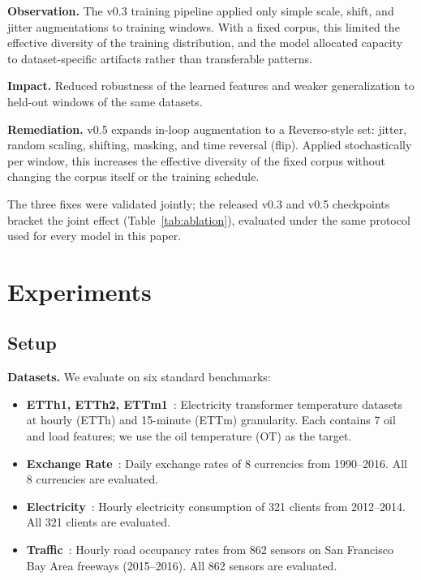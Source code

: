 \documentclass[11pt]{article}
\begin{document}
\textbf{Observation.} The v0.3 training pipeline applied only simple scale, shift, and jitter augmentations to training windows. With a fixed corpus, this limited the effective diversity of the training distribution, and the model allocated capacity to dataset-specific artifacts rather than transferable patterns.

\textbf{Impact.} Reduced robustness of the learned features and weaker generalization to held-out windows of the same datasets.

\textbf{Remediation.} v0.5 expands in-loop augmentation to a Reverso-style set: jitter, random scaling, shifting, masking, and time reversal (flip). Applied stochastically per window, this increases the effective diversity of the fixed corpus without changing the corpus itself or the training schedule.

The three fixes were validated jointly; the released v0.3 and v0.5 checkpoints bracket the joint effect (Table~\ref{tab:ablation}), evaluated under the same protocol used for every model in this paper.

\section{Experiments}
\label{sec:experiments}

\subsection{Setup}
\label{sec:setup}

\textbf{Datasets.} We evaluate on six standard benchmarks:

\begin{itemize}
\item \textbf{ETTh1, ETTh2, ETTm1}~\cite{ett}: Electricity transformer temperature datasets at hourly (ETTh) and 15-minute (ETTm) granularity. Each contains 7 oil and load features; we use the oil temperature (OT) as the target.
\item \textbf{Exchange Rate}~\cite{exchange}: Daily exchange rates of 8 currencies from 1990--2016. All 8 currencies are evaluated.
\item \textbf{Electricity}~\cite{electricity}: Hourly electricity consumption of 321 clients from 2012--2014. All 321 clients are evaluated.
\item \textbf{Traffic}~\cite{traffic}: Hourly road occupancy rates from 862 sensors on San Francisco Bay Area freeways (2015--2016). All 862 sensors are evaluated.
\end{itemize}
\end{document}
